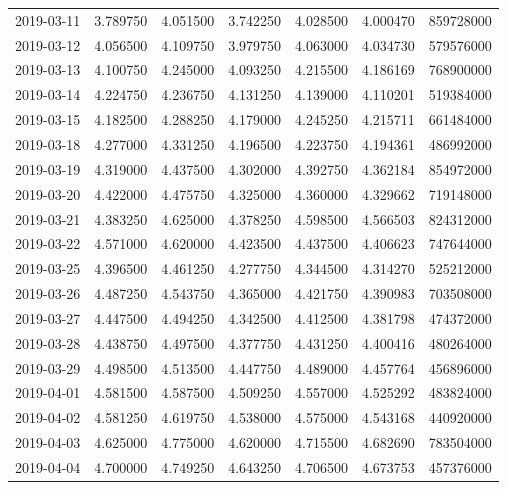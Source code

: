 \begin{tabular}{lrrrrrr}
2019-03-11 &    3.789750 &    4.051500 &    3.742250 &    4.028500 &    4.000470 &   859728000 \\
2019-03-12 &    4.056500 &    4.109750 &    3.979750 &    4.063000 &    4.034730 &   579576000 \\
2019-03-13 &    4.100750 &    4.245000 &    4.093250 &    4.215500 &    4.186169 &   768900000 \\
2019-03-14 &    4.224750 &    4.236750 &    4.131250 &    4.139000 &    4.110201 &   519384000 \\
2019-03-15 &    4.182500 &    4.288250 &    4.179000 &    4.245250 &    4.215711 &   661484000 \\
2019-03-18 &    4.277000 &    4.331250 &    4.196500 &    4.223750 &    4.194361 &   486992000 \\
2019-03-19 &    4.319000 &    4.437500 &    4.302000 &    4.392750 &    4.362184 &   854972000 \\
2019-03-20 &    4.422000 &    4.475750 &    4.325000 &    4.360000 &    4.329662 &   719148000 \\
2019-03-21 &    4.383250 &    4.625000 &    4.378250 &    4.598500 &    4.566503 &   824312000 \\
2019-03-22 &    4.571000 &    4.620000 &    4.423500 &    4.437500 &    4.406623 &   747644000 \\
2019-03-25 &    4.396500 &    4.461250 &    4.277750 &    4.344500 &    4.314270 &   525212000 \\
2019-03-26 &    4.487250 &    4.543750 &    4.365000 &    4.421750 &    4.390983 &   703508000 \\
2019-03-27 &    4.447500 &    4.494250 &    4.342500 &    4.412500 &    4.381798 &   474372000 \\
2019-03-28 &    4.438750 &    4.497500 &    4.377750 &    4.431250 &    4.400416 &   480264000 \\
2019-03-29 &    4.498500 &    4.513500 &    4.447750 &    4.489000 &    4.457764 &   456896000 \\
2019-04-01 &    4.581500 &    4.587500 &    4.509250 &    4.557000 &    4.525292 &   483824000 \\
2019-04-02 &    4.581250 &    4.619750 &    4.538000 &    4.575000 &    4.543168 &   440920000 \\
2019-04-03 &    4.625000 &    4.775000 &    4.620000 &    4.715500 &    4.682690 &   783504000 \\
2019-04-04 &    4.700000 &    4.749250 &    4.643250 &    4.706500 &    4.673753 &   457376000 \\

\end{tabular}
